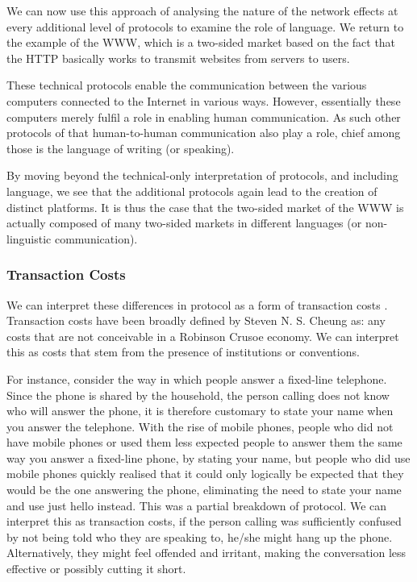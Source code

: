 \documentclass[a4paper,british]{article}\usepackage[]{graphicx}\usepackage[]{xcolor}
\begin{document}
We can now use this approach of analysing the nature of the network
effects at every additional level of protocols to examine the role
of language. We return to the example of the WWW, which is a two-sided
market based on the fact that the HTTP basically works to transmit
websites from servers to users. 

These technical protocols enable the communication between the various
computers connected to the Internet in various ways. However, essentially
these computers merely fulfil a role in enabling human communication.
As such other protocols of that human-to-human communication also
play a role, chief among those is the language of writing (or speaking).

By moving beyond the technical-only interpretation of protocols, and
including language, we see that the additional protocols again lead
to the creation of distinct platforms. It is thus the case that the
two-sided market of the WWW is actually composed of many two-sided
markets in different languages (or non-linguistic communication). 

\subsubsection*{Transaction Costs}

We can interpret these differences in protocol as a form of transaction
costs \citep{coase1937nature}. Transaction costs have been broadly
defined by Steven N. S. Cheung as: \textquotedbl any costs that are
not conceivable in a \textquotedbl Robinson Crusoe economy\textquotedbl .
We can interpret this as costs that stem from the presence of institutions
or conventions.

For instance, consider the way in which people answer a fixed-line
telephone. Since the phone is shared by the household, the person
calling does not know who will answer the phone, it is therefore customary
to state your name when you answer the telephone. With the rise of
mobile phones, people who did not have mobile phones or used them
less expected people to answer them the same way you answer a fixed-line
phone, by stating your name, but people who did use mobile phones
quickly realised that it could only logically be expected that they
would be the one answering the phone, eliminating the need to state
your name and use just \textquotedbl hello\textquotedbl{} instead.
This was a partial breakdown of protocol. We can interpret this as
transaction costs, if the person calling was sufficiently confused
by not being told who they are speaking to, he/she might hang up the
phone. Alternatively, they might feel offended and irritant, making
the conversation less effective or possibly cutting it short.
\end{document}
